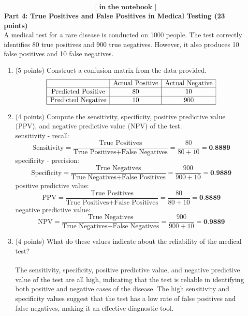 \documentclass[a3paper,12pt]{extarticle} %
\begin{document}
    \[
    \textbf{[ in the notebook ]}
    \]
    \subitem \textbf{Part 4: True Positives and False Positives in Medical Testing (23 points)}
    \\ A medical test for a rare disease is conducted on 1000 people. The test correctly identifies 80 true positives and 900 true negatives. However, it also produces 10 false positives and 10 false negatives.
    \begin{enumerate}
        \item (5 points) Construct a confusion matrix from the data provided.
        \[
        \begin{array}{|c|c|c|}
        \hline
        & \text{Actual Positive} & \text{Actual Negative} \\
        \hline
        \text{Predicted Positive} & 80 & 10 \\
        \hline
        \text{Predicted Negative} & 10 & 900 \\
        \hline
        \end{array}
        \]
        \item (4 points) Compute the sensitivity, specificity, positive predictive value (PPV), and negative
        predictive value (NPV) of the test.
        \\ sensitivity - recall:
        \[
        \text{Sensitivity} = \frac{\text{True Positives}}{\text{True Positives} + \text{False Negatives}} = \frac{80}{80 + 10} = \textbf{0.8889}
        \]
        specificity - precision:
        \[
        \text{Specificity} = \frac{\text{True Negatives}}{\text{True Negatives} + \text{False Positives}} = \frac{900}{900 + 10} = \textbf{0.9889}
        \]
        positive predictive value:
        \[
        \text{PPV} = \frac{\text{True Positives}}{\text{True Positives} + \text{False Positives}} = \frac{80}{80 + 10} = \textbf{0.8889}
        \]
        negative predictive value:
        \[
        \text{NPV} = \frac{\text{True Negatives}}{\text{True Negatives} + \text{False Negatives}} = \frac{900}{900 + 10} = \textbf{0.9889}
        \]
        \item (4 points) What do these values indicate about the reliability of the medical test?
        \\\\ The sensitivity, specificity, positive predictive value, and negative predictive value of the test are all high, indicating that the test is reliable in identifying both positive and negative cases of the disease. The high sensitivity and specificity values suggest that the test has a low rate of false positives and false negatives, making it an effective diagnostic tool.

\end{enumerate}
\end{document}
